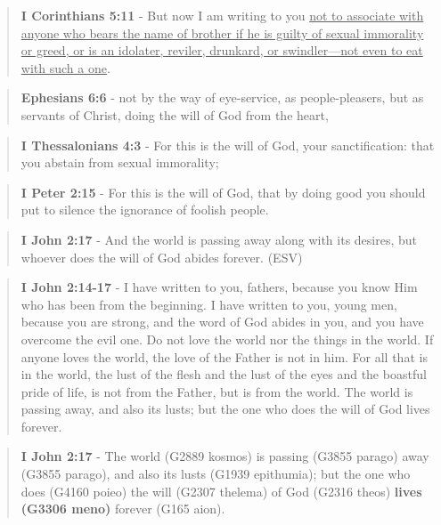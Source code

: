 \documentclass[11pt]{article}
\begin{document}
\begin{quote}
\textbf{I Corinthians 5:11} - But now I am writing to you \uline{not to associate with anyone who bears the name of brother if he is guilty of sexual immorality or greed, or is an idolater, reviler, drunkard, or swindler—not even to eat with such a one}.
\end{quote}

\begin{quote}
\textbf{Ephesians 6:6} - not by the way of eye-service, as people-pleasers, but as servants of Christ, doing the will of God from the heart,
\end{quote}

\begin{quote}
\textbf{I Thessalonians 4:3} - For this is the will of God, your sanctification: that you abstain from sexual immorality;
\end{quote}

\begin{quote}
\textbf{I Peter 2:15} - For this is the will of God, that by doing good you should put to silence the ignorance of foolish people.
\end{quote}

\begin{quote}
\textbf{I John 2:17} - And the world is passing away along with its desires, but whoever does the will of God abides forever. (ESV)
\end{quote}

\begin{quote}
\textbf{I John 2:14-17} - I have written to you, fathers, because you know Him who has been from the beginning. I have written to you, young men, because you are strong, and the word of God abides in you, and you have overcome the evil one.  Do not love the world nor the things in the world. If anyone loves the world, the love of the Father is not in him.  For all that is in the world, the lust of the flesh and the lust of the eyes and the boastful pride of life, is not from the Father, but is from the world.  The world is passing away, and also its lusts; but the one who does the will of God lives forever.
\end{quote}

\begin{quote}
\textbf{I John 2:17} - The world (G2889 kosmos) is passing (G3855 parago) away (G3855 parago), and also its lusts (G1939 epithumia); but the one who does (G4160 poieo) the will (G2307 thelema) of God (G2316 theos) \textbf{lives (G3306 meno)} forever (G165 aion).
\end{quote}
\end{document}
